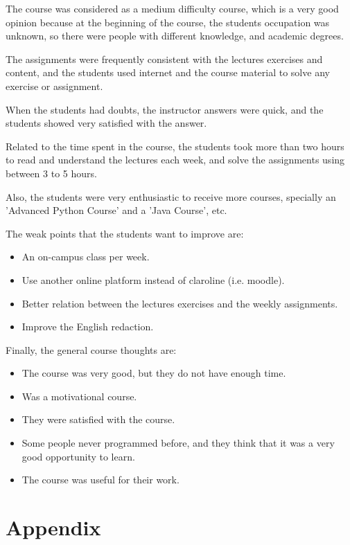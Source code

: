 \documentclass[letter, 10pt]{article}
\begin{document}
The course was considered as a medium difficulty course,
which is a very good opinion because at the beginning of the course,
the students occupation was unknown, so there were people with
different knowledge, and academic degrees.

The assignments were frequently consistent with the lectures exercises
and content, and the students used internet and the course material
to solve any exercise or assignment.

When the students had doubts, the instructor answers were quick,
and the students showed very satisfied with the answer.

Related to the time spent in the course,
the students took more than two hours to read and understand the lectures
each week, and solve the assignments using between 3 to 5 hours.

Also, the students were very enthusiastic to receive more courses,
specially an 'Advanced Python Course' and a 'Java Course', etc.

The weak points that the students want to improve are:
\begin{itemize}
    \item An on-campus class per week.
    \item Use another online platform instead of claroline (i.e. moodle).
    \item Better relation between the lectures exercises and the weekly assignments.
    \item Improve the English redaction.
\end{itemize}


Finally, the general course thoughts are:

\begin{itemize}
    \item The course was very good, but they do not have enough time.
    \item Was a motivational course.
    \item They were satisfied with the course.
    \item Some people never programmed before, and they think that it was a very good opportunity to learn.
    \item The course was useful for their work.
\end{itemize}

\newpage
\section{Appendix}
\end{document}
